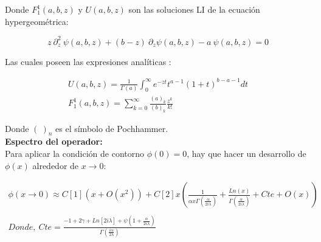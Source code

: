 Donde $F _1 ^1(a,b,z)$ y $ U(a,b,z)$ son las soluciones LI de la ecuación hypergeométrica:

\begin{equation}
    z \ \partial ^2 _z \ \psi (a,b,z) + (b-z) \
    \partial _z \psi (a,b,z)
    -a \ \psi (a,b,z) = 0
\end{equation}

Las cuales poseen las expresiones analíticas  : 

\begin{equation}
\begin{array}{c}
	U(a,b,z) = \frac{1}{\Gamma (a)} 
	\int _0 ^{\infty} e ^{-zt}
	t ^{a-1}
	(1+t) ^{b-a-1}
	dt \\
	F _1 ^1 (a,b,z) = \sum _ {k=0} ^{\infty} 
	\frac{(a) _k}{(b) _k} 
	\frac{z ^k}{k!} 
\end{array}
\end{equation}

Donde $( \   ) _n$ es el símbolo de Pochhammer. \\






\textbf{Espectro del operador:} \\


Para aplicar la condición de contorno $\phi (0) = 0$, hay que hacer un desarrollo de $\phi(x)$  alrededor de $x \rightarrow 0$:

\begin{equation}
\begin{array}{c}
\phi (x \rightarrow 0) \approx
C[1] ( x + O(x ^2)) + 
C[2] x 
\left( 
\frac{1}{  \alpha x  \Gamma ( \frac{ \alpha}{2 i \lambda}  )   }  +
\frac{Ln(x) }{\Gamma ( \frac{ \alpha}{2 i \lambda} ) } + Cte + O(x)
\right)
\\ \\
Donde,  \ Cte = 
\frac{
-1 + 2 \gamma + Ln[2 i \lambda] + \psi (1 + \frac{ \alpha}{2 i \lambda})
}
{\Gamma (\frac{i \alpha}{2 \lambda})}
\end{array}
\label{eq.scat}
\end{equation}

